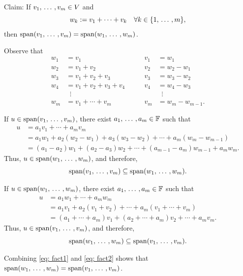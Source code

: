 \begin{xrcs}
  Claim: If $v_1, {\, \ldots \,\,}, v_m \in V$ and
  \[
    w_k := v_1 + \cdots + v_k \quad \forall k\in \{1, {\, \ldots \,\,}, m\},
  \]
  then $\operatorname{span} (v_1, {\, \ldots \,\,}, v_m) = \operatorname{span} (w_1, {\, \ldots \,\,}, w_m)$.

  \begin{xprf}
    Observe that
    \[
    \begin{aligned}
      w_1 &= v_1
      & \qquad v_1 &= w_1       \\
      w_2 &= v_1 + v_2
      & \qquad v_2 &= w_2 - w_1 \\
      w_3 &= v_1 + v_2 + v_3
      & \qquad v_3 &= w_3 - w_2 \\
      w_4 &= v_1 + v_2 + v_3 + v_4
      & \qquad v_4 &= w_4 - w_3 \\
      &\;\;\vdots
      &            &\;\;\vdots \\
      w_m &= v_1 + \cdots + v_m
      & \qquad v_m &= w_m - w_{m-1}.
    \end{aligned}
    \]

    \StepOne If $u \in \operatorname{span} (v_1, {\, \ldots \,\,}, v_m)$, there exist $a_1, {\, \ldots \,\,}, a_m \in \mathbb{F}$ such that
    \[
    \begin{aligned}
      u &= a_1 v_1 + \cdots + a_m v_m \\
        &= a_1 w_1 + a_2 (w_2 - w_1) + a_3 (w_3 - w_2) + \cdots + a_m (w_m - w_{m-1}) \\
        &= (a_1 - a_2) w_1 + (a_2 - a_3) w_2 + \cdots + (a_{m-1} - a_m) w_{m-1} + a_m w_m.
    \end{aligned}
    \]
    Thus, $u \in \operatorname{span} (w_1, {\, \ldots \,\,}, w_m)$, and therefore,
    \begin{equation}
      \label{eq: fact1}
      \operatorname{span} (v_1, {\, \ldots \,\,}, v_m) \subseteq \operatorname{span} (w_1, {\, \ldots \,\,}, w_m).
    \end{equation}

    \StepTwo If $u \in \operatorname{span} (w_1, {\, \ldots \,\,}, w_m)$, there exist $a_1, {\, \ldots \,\,}, a_m \in \mathbb{F}$ such that
    \[
    \begin{aligned}
      u &= a_1 w_1 + \cdots + a_m w_m \\
        &= a_1 v_1 + a_2 (v_1+v_2) + \cdots + a_m (v_1 + \cdots + v_m) \\
        &= (a_1 + \cdots + a_m) v_1 + (a_2 + \cdots + a_m) v_2 + \cdots + a_m v_m.
    \end{aligned}
    \]
    Thus, $u \in \operatorname{span} (v_1, {\, \ldots \,\,}, v_m)$, and therefore,
    \begin{equation}
      \label{eq: fact2}
      \operatorname{span} (w_1, {\, \ldots \,\,}, w_m) \subseteq \operatorname{span} (v_1, {\, \ldots \,\,}, v_m).
    \end{equation}

    Combining \eqref{eq: fact1} and \eqref{eq: fact2} shows that $\operatorname{span} (w_1, {\, \ldots \,\,}, w_m) = \operatorname{span} (v_1, {\, \ldots \,\,}, v_m)$.
  \end{xprf}
\end{xrcs}

